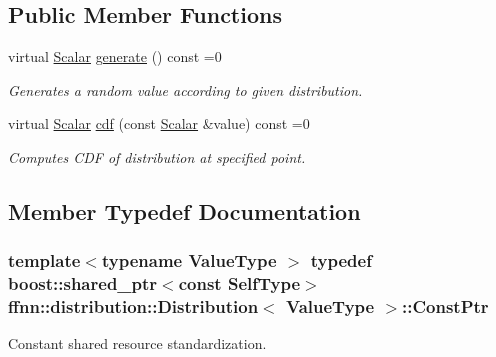 \subsection*{Public Member Functions}
\begin{DoxyCompactItemize}
\item 
virtual \hyperlink{classffnn_1_1distribution_1_1_distribution_af0757b85660b34a2ae32a285cfdbfd1d}{Scalar} \hyperlink{classffnn_1_1distribution_1_1_distribution_ac4581c9b98931804766020773af0f6aa}{generate} () const =0
\begin{DoxyCompactList}\small\item\em Generates a random value according to given distribution. \end{DoxyCompactList}\item 
virtual \hyperlink{classffnn_1_1distribution_1_1_distribution_af0757b85660b34a2ae32a285cfdbfd1d}{Scalar} \hyperlink{classffnn_1_1distribution_1_1_distribution_a6dc8a8a1f57ddf862cafd671daf66d31}{cdf} (const \hyperlink{classffnn_1_1distribution_1_1_distribution_af0757b85660b34a2ae32a285cfdbfd1d}{Scalar} \&value) const =0
\begin{DoxyCompactList}\small\item\em Computes C\-D\-F of distribution at specified point. \end{DoxyCompactList}\end{DoxyCompactItemize}


\subsection{Member Typedef Documentation}
\hypertarget{classffnn_1_1distribution_1_1_distribution_a829c8056b31313f6196f5659ca9503cc}{
\subsubsection[{Const\-Ptr}]{\setlength{\rightskip}{0pt plus 5cm}template$<$typename Value\-Type $>$ typedef boost\-::shared\-\_\-ptr$<$const {\bf Self\-Type}$>$ {\bf ffnn\-::distribution\-::\-Distribution}$<$ Value\-Type $>$\-::{\bf Const\-Ptr}}}\label{classffnn_1_1distribution_1_1_distribution_a829c8056b31313f6196f5659ca9503cc}


Constant shared resource standardization. 

